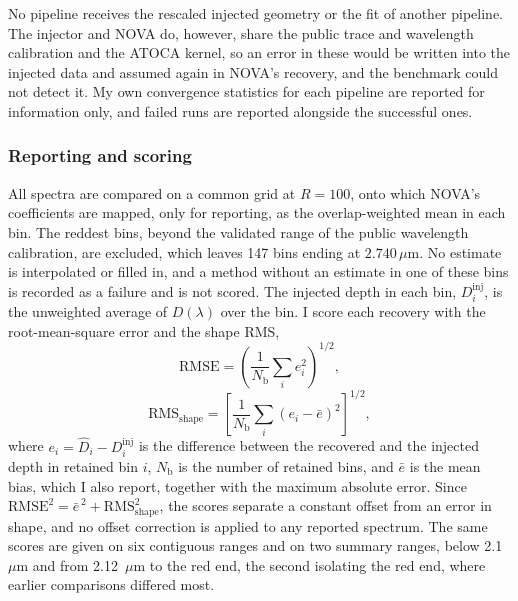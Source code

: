 No pipeline receives the rescaled injected geometry or the fit of another
pipeline. The injector and NOVA do, however, share the public trace and
wavelength calibration and the ATOCA kernel, so an error in these would be
written into the injected data and assumed again in NOVA's recovery, and the
benchmark could not detect it. My own convergence statistics for each pipeline are reported for information
only, and failed runs are reported alongside the successful ones.

\subsubsection{Reporting and scoring}
\label{sec:reporting}

All spectra are compared on a common grid at $R=100$, onto which NOVA's
coefficients are mapped, only for reporting, as the overlap-weighted mean in
each bin. The reddest
bins, beyond the validated range of the public wavelength calibration, are
excluded, which leaves 147 bins ending at $2.740\,\mu\mathrm{m}$. No estimate
is interpolated or filled in, and a method without an estimate in one of these
bins is recorded as a failure and is not scored. The injected depth in
each bin, $D_i^{\mathrm{inj}}$, is the unweighted average of $D(\lambda)$
over the bin. I score each recovery with the root-mean-square error and the
shape RMS,
\begin{equation}
 \mathrm{RMSE}=
 \left(\frac{1}{N_{\mathrm{b}}}\sum_i e_i^2\right)^{1/2},
 \label{eq:absolute-rmse}
\end{equation}
\begin{equation}
 \mathrm{RMS}_{\mathrm{shape}}=
 \left[\frac{1}{N_{\mathrm{b}}}\sum_i(e_i-\bar e)^2\right]^{1/2},
 \label{eq:morphology-rmse}
\end{equation}
where $e_i=\widehat D_i-D_i^{\mathrm{inj}}$ is the difference between the
recovered and the injected depth in retained bin $i$, $N_{\mathrm{b}}$ is the
number of retained bins, and $\bar e$ is the mean bias, which I also report,
together with the maximum absolute error. Since
$\mathrm{RMSE}^2=\bar e^{\,2}+\mathrm{RMS}_{\mathrm{shape}}^2$, the scores
separate a constant offset from an error in shape, and no offset correction is
applied to any reported spectrum. The same scores are given on six contiguous ranges and on two summary
ranges, below 2.1~$\mu\mathrm{m}$ and from 2.12~$\mu\mathrm{m}$ to the red end, the second
isolating the red end, where earlier comparisons differed most.

